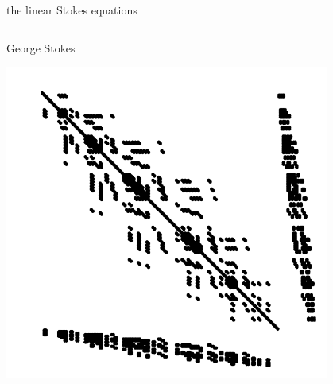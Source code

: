\documentclass[10pt,hyperref,dvipsnames]{beamer}
\begin{document}
\begin{frame}{the linear Stokes equations}
\begin{columns}
\begin{column}{0.4\textwidth}
\hfill {\tiny George Stokes}

\vspace{7mm}
\hfill \includegraphics[width=0.8\textwidth]{figs/Kstokes.pdf}
\end{column}

\end{columns}
\end{frame}
\end{document}
